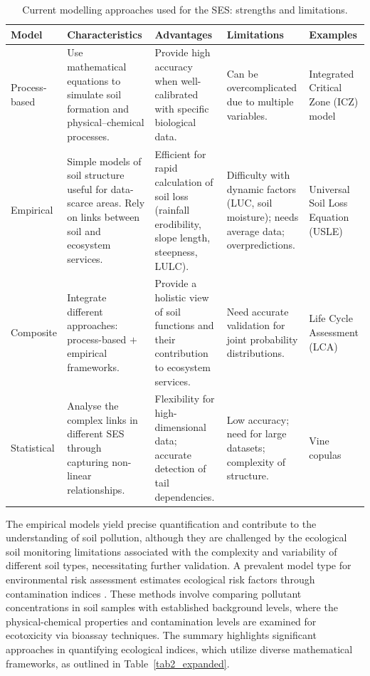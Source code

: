 \documentclass[sn-mathphys-num]{sn-jnl}
\begin{document}
\begin{table}[htbp]
\caption{Current modelling approaches used for the SES: strengths and
    limitations.}\label{tab3}
\begin{tabularx}{\textwidth}{@{} l p{2.5cm} p{2.5cm} p{2.5cm} X @{}}
\toprule
\textbf{Model} & \textbf{Characteristics} & \textbf{Advantages}
    & \textbf{Limitations} & \textbf{Examples} \\
\midrule
Process-based
    & Use mathematical equations to simulate soil formation and
      physical--chemical processes.
    & Provide high accuracy when well-calibrated with specific biological
      data.
    & Can be overcomplicated due to multiple variables.
    & Integrated Critical Zone (ICZ) model \cite{Giannakis2017} \\[6pt]
Empirical
    & Simple models of soil structure useful for data-scarce areas. Rely on
      links between soil and ecosystem services.
    & Efficient for rapid calculation of soil loss (rainfall erodibility,
      slope length, steepness, LULC).
    & Difficulty with dynamic factors (LUC, soil moisture); needs average
      data; overpredictions.
    & Universal Soil Loss Equation (USLE) \cite{Benavidez2018} \\[6pt]
Composite
    & Integrate different approaches: process-based $+$ empirical
      frameworks.
    & Provide a holistic view of soil functions and their contribution to
      ecosystem services.
    & Need accurate validation for joint probability distributions.
    & Life Cycle Assessment (LCA) \cite{Sadhukhan2022} \\[6pt]
Statistical
    & Analyse the complex links in different SES through capturing
      non-linear relationships.
    & Flexibility for high-dimensional data; accurate detection of tail
      dependencies.
    & Low accuracy; need for large datasets; complexity of structure.
    & Vine copulas \cite{Luetal2020} \\
\bottomrule
\end{tabularx}
\end{table}

The empirical models yield precise quantification and contribute to the
understanding of soil pollution, although they are challenged by the
ecological soil monitoring limitations associated with the complexity and
variability of different soil types, necessitating further validation. A
prevalent model type for environmental risk assessment estimates ecological
risk factors through contamination indices
\cite{Stojic2019,Mohammad2025,Sun2025,Edo2024,Chon2011,Ferreira2022}. These
methods involve comparing pollutant concentrations in soil samples with
established background levels, where the physical-chemical properties and
contamination levels are examined for ecotoxicity via bioassay techniques. The
summary highlights significant approaches in quantifying ecological indices,
which utilize diverse mathematical frameworks, as outlined in
Table~\ref{tab2_expanded}.
\end{document}
